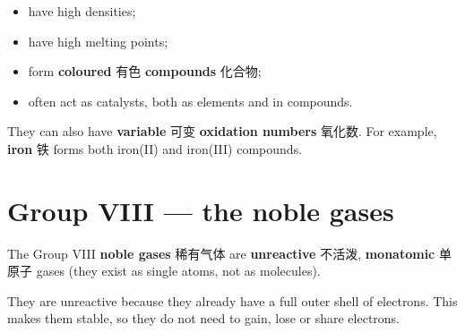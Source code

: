 \documentclass[11pt]{article}
\begin{document}
\begin{itemize}
\item have high densities;

\item have high melting points;

\item form \textbf{coloured} 有色 \textbf{compounds} 化合物;

\item often act as catalysts, both as elements and in compounds.

\end{itemize}

They can also have \textbf{variable} 可变 \textbf{oxidation numbers} 氧化数. For example, \textbf{iron} 铁 forms both iron(II) and iron(III) compounds.

\section*{Group VIII — the noble gases}

The Group VIII \textbf{noble gases} 稀有气体 are \textbf{unreactive} 不活泼, \textbf{monatomic} 单原子 gases (they exist as single atoms, not as molecules).

They are unreactive because they already have a full outer shell of electrons. This makes them stable, so they do not need to gain, lose or share electrons.
\end{document}
